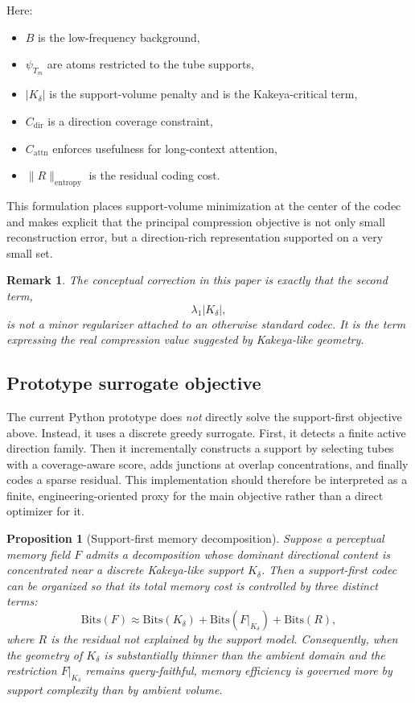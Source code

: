 \documentclass[11pt]{article}
\newtheorem{proposition}{Proposition}
\newtheorem{remark}{Remark}
\begin{document}
Here:
\begin{itemize}[leftmargin=1.5em]
\item $B$ is the low-frequency background,
\item $\psi_{T_m}$ are atoms restricted to the tube supports,
\item $|K_\delta|$ is the support-volume penalty and is the Kakeya-critical term,
\item $C_{\mathrm{dir}}$ is a direction coverage constraint,
\item $C_{\mathrm{attn}}$ enforces usefulness for long-context attention,
\item $\|R\|_{\mathrm{entropy}}$ is the residual coding cost.
\end{itemize}

This formulation places support-volume minimization at the center of the codec and makes explicit that the principal compression objective is not only small reconstruction error, but a direction-rich representation supported on a very small set.

\begin{remark}
The conceptual correction in this paper is exactly that the second term,
\begin{equation}
\lambda_1 |K_\delta|,
\end{equation}
is not a minor regularizer attached to an otherwise standard codec. It is the term expressing the real compression value suggested by Kakeya-like geometry.
\end{remark}

\subsection{Prototype surrogate objective}
The current Python prototype does \emph{not} directly solve the support-first objective above. Instead, it uses a discrete greedy surrogate. First, it detects a finite active direction family. Then it incrementally constructs a support by selecting tubes with a coverage-aware score, adds junctions at overlap concentrations, and finally codes a sparse residual. This implementation should therefore be interpreted as a finite, engineering-oriented proxy for the main objective rather than a direct optimizer for it.

\begin{proposition}[Support-first memory decomposition]
Suppose a perceptual memory field $F$ admits a decomposition whose dominant directional content is concentrated near a discrete Kakeya-like support $K_\delta$. Then a support-first codec can be organized so that its total memory cost is controlled by three distinct terms:
\begin{equation}
\mathrm{Bits}(F)\approx \mathrm{Bits}(K_\delta)+\mathrm{Bits}(F|_{K_\delta})+\mathrm{Bits}(R),
\end{equation}
where $R$ is the residual not explained by the support model. Consequently, when the geometry of $K_\delta$ is substantially thinner than the ambient domain and the restriction $F|_{K_\delta}$ remains query-faithful, memory efficiency is governed more by support complexity than by ambient volume.
\end{proposition}
\end{document}
